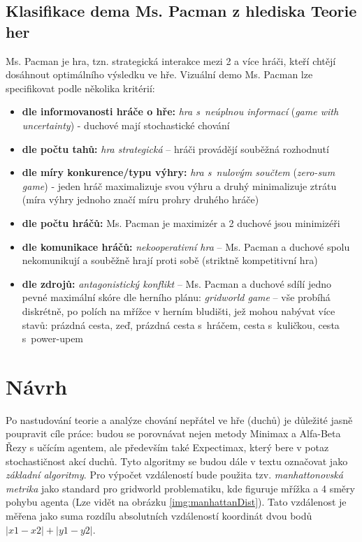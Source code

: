\subsection{Klasifikace dema Ms. Pacman z hlediska Teorie her}
Ms. Pacman je hra, tzn. strategická interakce mezi 2 a více hráči, kteří chtějí dosáhnout optimálního výsledku ve hře.
Vizuální demo Ms. Pacman lze specifikovat podle několika kritérií:
\begin{itemize}
  \item \textbf{dle informovanosti hráče o hře:} \textit{hra s neúplnou informací} (\textit{game with uncertainty}) - duchové mají stochastické chování
  \item \textbf{dle počtu tahů:} \textit{hra strategická} – hráči provádějí souběžná rozhodnutí
  \item \textbf{dle míry konkurence/typu výhry:} \textit{hra s nulovým součtem} (\textit{zero-sum game})  - jeden hráč maximalizuje svou výhru a druhý minimalizuje ztrátu (míra výhry jednoho značí míru prohry druhého hráče)
  \item \textbf{dle počtu hráčů:} Ms. Pacman je maximizér a 2 duchové jsou minimizéři
  \item \textbf{dle komunikace hráčů:} \textit{nekooperativní hra} – Ms. Pacman a duchové spolu nekomunikují a souběžně hrají proti sobě (striktně kompetitivní hra)
  \item \textbf{dle zdrojů:} \textit{antagonistický konflikt} – Ms. Pacman a duchové sdílí jedno pevné maximální skóre
  dle herního plánu: \textit{gridworld game} – vše probíhá diskrétně, po polích na mřížce v herním bludišti, jež mohou nabývat více stavů: prázdná cesta, zeď, prázdná cesta s hráčem, cesta s kuličkou, cesta s power-upem
\end{itemize}

\section{Návrh}
\label{navrh}
Po nastudování teorie a analýze chování nepřátel ve hře (duchů) je důležité jasně poupravit cíle práce: budou se porovnávat nejen metody Minimax a Alfa-Beta Řezy s učícím agentem, ale především také Expectimax, který bere v potaz stochastičnost akcí duchů. Tyto algoritmy se budou dále v textu označovat jako \textit{základní algoritmy}.
\newline
Pro výpočet vzdáleností bude použita tzv. \textit{manhattonovská metrika} \cite{manhattanDist} jako standard pro gridworld problematiku, kde figuruje mřížka a 4 směry pohybu agenta (Lze vidět na obrázku \ref{img:manhattanDist}). Tato vzdálenost je měřena jako suma rozdílu absolutních vzdáleností koordinát dvou bodů $\left|x1-x2\right|+\left|y1-y2\right|$.

